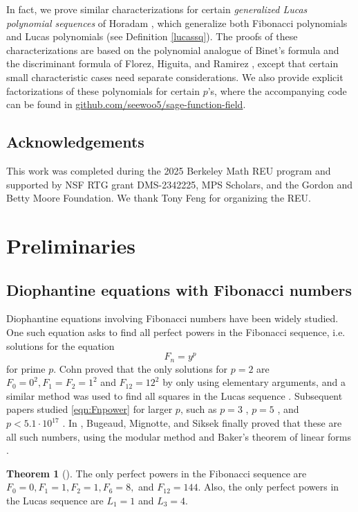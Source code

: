 \documentclass[letterpaper, 10pt]{article}
\newcommand{\1}{\mathds{1}}	%
\theoremstyle{definition}
\newtheorem{theorem}{Theorem}[section]
\theoremstyle{remark}
\begin{document}
In fact, we prove similar characterizations for certain \emph{generalized Lucas polynomial sequences} of Horadam \cite{Horadam1996}, which generalize both Fibonacci polynomials and Lucas polynomials (see Definition \ref{lucassq}).
The proofs of these characterizations are based on the polynomial analogue of Binet's formula and the discriminant formula of Florez, Higuita, and Ramirez \cite{florez2019resultant}, except that certain small characteristic cases need separate considerations.
We also provide explicit factorizations of these polynomials for certain $p$'s, where the accompanying code can be found in \href{https://github.com/seewoo5/sage-function-field}{github.com/seewoo5/sage-function-field}.

\subsection*{Acknowledgements}

This work was completed during the 2025 Berkeley Math REU program and supported by NSF RTG grant DMS-2342225, MPS Scholars, and the Gordon and Betty Moore Foundation.
We thank Tony Feng for organizing the REU.
\section{Preliminaries}
\label{sec:prelim}


\subsection{Diophantine equations with Fibonacci numbers}
\label{subsec:prelim_diophantine}

Diophantine equations involving Fibonacci numbers have been widely studied.
One such equation asks to find all perfect powers in the Fibonacci sequence, i.e. solutions for the equation
\begin{equation}
\label{eqn:Fnpower}    
F_n = y^p
\end{equation}
for prime \(p\).
Cohn \cite{cohn1964square} proved that the only solutions for \(p = 2\) are \(F_0 = 0^2, F_1 = F_2 = 1^2\) and \(F_{12} = 12^2\) by only using  elementary arguments, and a similar method was used to find all squares in the Lucas sequence \cite{cohn1965lucas}.
Subsequent papers studied \eqref{eqn:Fnpower} for larger \(p\), such as \(p = 3\) \cite{london1969fibonacci,petho1983full}, \(p = 5\) \cite{petho1981perfect}, and \(p < 5.1 \cdot 10^{17}\) \cite{petho2001diophantine}.
In \cite{bugeaud2006classical}, Bugeaud, Mignotte, and Siksek finally proved that these are all such numbers, using the modular method \cite{wiles1995modular,taylor1995ring} and Baker's theorem of linear forms \cite{shorey1986exponential}.
\begin{theorem}[{\cite[Theorem 1, Theorem 2]{bugeaud2006classical}}]
    The only perfect powers in the Fibonacci sequence are \(F_0 = 0, F_1 = 1, F_2 = 1, F_6 = 8,\) and \(F_{12} = 144\).
    Also, the only perfect powers in the Lucas sequence are \(L_1 = 1\) and \(L_3 = 4\).
\end{theorem}
\end{document}
